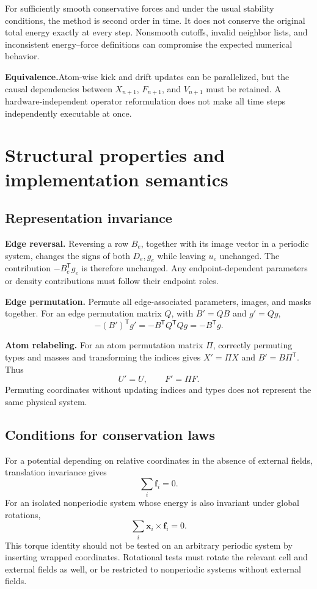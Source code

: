 \documentclass[11pt,a4paper]{article}
\newcommand{\parallelmeaning}{\par\noindent\textbf{Equivalence.}\quad}
\newcommand{\vect}[1]{\bm{#1}}
\theoremstyle{definition}
\begin{document}
For sufficiently smooth conservative forces and under the usual stability conditions, the method
is second order in time. It does not conserve the original total energy exactly at every step.
Nonsmooth cutoffs, invalid neighbor lists, and inconsistent energy--force definitions can
compromise the expected numerical behavior.

\parallelmeaning Atom-wise kick and drift updates can be parallelized, but the causal dependencies between $X_{n+1}$, $F_{n+1}$, and $V_{n+1}$ must be retained. A hardware-independent operator reformulation does not make all time steps independently executable at once.
\section{Structural properties and implementation semantics}
\label{sec:validation}
\subsection{Representation invariance}

\textbf{Edge reversal.} Reversing a row $B_e$, together with its image vector in a periodic
system, changes the signs of both $D_e,g_e$ while leaving $u_e$ unchanged. The contribution
$-B_e^{\mathsf T}g_e$ is therefore unchanged. Any endpoint-dependent parameters or density
contributions must follow their endpoint roles.

\textbf{Edge permutation.} Permute all edge-associated parameters, images, and masks together.
For an edge permutation matrix $Q$, with $B'=QB$ and $g'=Qg$,
\begin{equation}
-(B')^{\mathsf T}g'=-B^{\mathsf T}Q^{\mathsf T}Qg=-B^{\mathsf T}g.
\end{equation}

\textbf{Atom relabeling.} For an atom permutation matrix $\Pi$, correctly permuting types and masses and transforming the indices gives $X'=\Pi X$ and $B'=B\Pi^{\mathsf T}$. Thus
\begin{equation}
U'=U,\qquad F'=\Pi F.
\end{equation}
Permuting coordinates without updating indices and types does not represent the same physical
system.

\subsection{Conditions for conservation laws}
For a potential depending on relative coordinates in the absence of external fields, translation
invariance gives
\begin{equation}
\sum_i\vect f_i=0.
\end{equation}
For an isolated nonperiodic system whose energy is also invariant under global rotations,
\begin{equation}
\sum_i\vect x_i\times\vect f_i=0.
\end{equation}
This torque identity should not be tested on an arbitrary periodic system by inserting wrapped
coordinates. Rotational tests must rotate the relevant cell and external fields as well, or be
restricted to nonperiodic systems without external fields.
\end{document}
